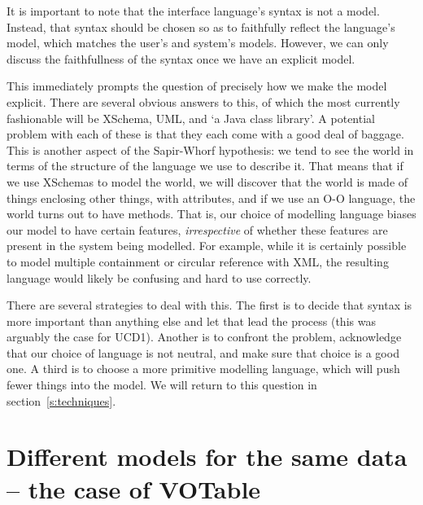 \documentclass[11pt,twoside]{article}
\begin{document}
It is important to note that the interface language's syntax is not a
model.  Instead, that syntax should be chosen so as to faithfully
reflect the language's model, which matches the user's and system's
models.  However, we can only discuss the faithfullness of the syntax
once we have an explicit model.

This immediately prompts the question of precisely how we make the model
explicit.  There are several obvious answers to this, of which the
most currently fashionable will be XSchema, UML, and `a Java class
library'.  A potential problem with each of these is that they each
come with a good deal of baggage.  This is another aspect of the
Sapir-Whorf hypothesis: we tend to see the world in terms of the
structure of the language we use to describe it.  That means that if
we use XSchemas to model the world, we will discover that the world is
made of things enclosing other things, with attributes, and if we use
an O-O language, the world turns out to have methods.  That is, our
choice of modelling language biases our model to have certain
features, \emph{irrespective} of whether these features are present in
the system being modelled.  For example, while it is certainly
possible to model multiple containment or circular reference with XML,
the resulting language would likely be confusing and hard to use
correctly.


There are several strategies to deal with this.  The first is to
decide that syntax is more important than anything else and let that
lead the process (this was arguably the case for UCD1).  Another is to confront
the problem, acknowledge that our choice of language is not neutral,
and make sure that choice is a good one.  A third is to choose a
more primitive modelling language, which will push fewer things into
the model.  We will return to this question in section~\ref{s:techniques}.



\section{Different models for the same data -- the case of VOTable}
\end{document}
